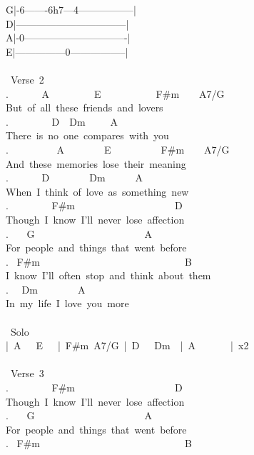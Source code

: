 {G|-6-------6h7---4-----------------|\\
D|---------------------------------|\\
A|-0-------------------------------|\\
E|---------------0-----------------|\\
\\
\lbrack\ Verse\ 2\rbrack\\
. \ \ \ \ \ \ A\ \ \ \ \ \ \ \ \ E\ \ \ \ \ \ \ \ \ \ \ F\#m\ \ \ \ A7/G\\
But\ of\ all\ these\ friends\ and\ lovers\\
. \ \ \ \ \ \ \ \ D\ \ Dm\ \ \ \ \ A\\
There\ is\ no\ one\ compares\ with\ you\\
. \ \ \ \ \ \ \ \ \ A\ \ \ \ \ \ \ \ E\ \ \ \ \ \ \ \ \ \ F\#m\ \ \ \ A7/G\\
And\ these\ memories\ lose\ their\ meaning\\
. \ \ \ \ \ \ D\ \ \ \ \ \ \ \ Dm\ \ \ \ \ \ A\\
When\ I\ think\ of\ love\ as\ something\ new\\
. \ \ \ \ \ \ \ \ F\#m\ \ \ \ \ \ \ \ \ \ \ \ \ \ \ \ \ \ \ \ D\\
Though\ I\ know\ I'll\ never\ lose\ affection\\
. \ \ \ G\ \ \ \ \ \ \ \ \ \ \ \ \ \ \ \ \ \ \ \ \ \ A\\
For\ people\ and\ things\ that\ went\ before\\
. \ F\#m\ \ \ \ \ \ \ \ \ \ \ \ \ \ \ \ \ \ \ \ \ \ \ \ \ \ \ \ \ B\\
I\ know\ I'll\ often\ stop\ and\ think\ about\ them\\
. \ \ Dm\ \ \ \ \ \ \ \ A\\
In\ my\ life\ I\ love\ you\ more\\
\\
\lbrack\ Solo\rbrack\\
|\ A\ \ \ E\ \ \ |\ F\#m\ A7/G\ |\ D\ \ \ Dm\ \ |\ A\ \ \ \ \ \ \ |\ x2\\
\\
\lbrack\ Verse\ 3\rbrack\\
. \ \ \ \ \ \ \ \ F\#m\ \ \ \ \ \ \ \ \ \ \ \ \ \ \ \ \ \ \ \ D\\
Though\ I\ know\ I'll\ never\ lose\ affection\\
. \ \ \ G\ \ \ \ \ \ \ \ \ \ \ \ \ \ \ \ \ \ \ \ \ \ A\\
For\ people\ and\ things\ that\ went\ before\\
. \ F\#m\ \ \ \ \ \ \ \ \ \ \ \ \ \ \ \ \ \ \ \ \ \ \ \ \ \ \ \ \ B\\
}
